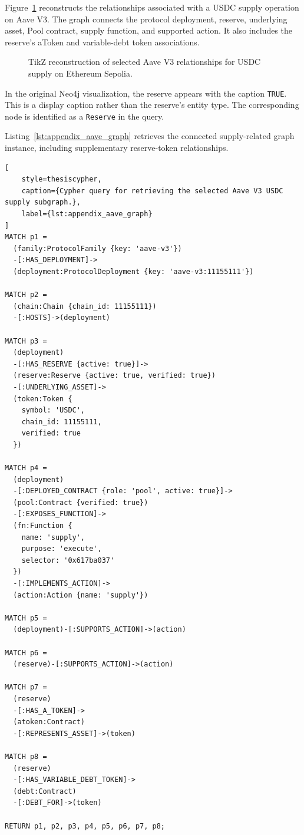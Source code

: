 Figure~\ref{fig:appendix_aave_neo4j} reconstructs the
relationships associated with a USDC supply operation
on Aave V3. The graph connects the protocol deployment,
reserve, underlying asset, Pool contract, supply function,
and supported action. It also includes the reserve's
aToken and variable-debt token associations.

\begin{figure}[H]
    \centering
    \resizebox{\linewidth}{!}{%
    }
    \caption{TikZ reconstruction of selected Aave V3
    relationships for USDC supply on Ethereum Sepolia.}
    \label{fig:appendix_aave_neo4j}
\end{figure}

In the original Neo4j visualization, the reserve appears
with the caption \texttt{TRUE}. This is a display caption
rather than the reserve's entity type. The corresponding
node is identified as a \texttt{Reserve} in the query.

Listing~\ref{lst:appendix_aave_graph} retrieves the
connected supply-related graph instance, including
supplementary reserve-token relationships.

\begin{lstlisting}[
    style=thesiscypher,
    caption={Cypher query for retrieving the selected Aave V3 USDC supply subgraph.},
    label={lst:appendix_aave_graph}
]
MATCH p1 =
  (family:ProtocolFamily {key: 'aave-v3'})
  -[:HAS_DEPLOYMENT]->
  (deployment:ProtocolDeployment {key: 'aave-v3:11155111'})

MATCH p2 =
  (chain:Chain {chain_id: 11155111})
  -[:HOSTS]->(deployment)

MATCH p3 =
  (deployment)
  -[:HAS_RESERVE {active: true}]->
  (reserve:Reserve {active: true, verified: true})
  -[:UNDERLYING_ASSET]->
  (token:Token {
    symbol: 'USDC',
    chain_id: 11155111,
    verified: true
  })

MATCH p4 =
  (deployment)
  -[:DEPLOYED_CONTRACT {role: 'pool', active: true}]->
  (pool:Contract {verified: true})
  -[:EXPOSES_FUNCTION]->
  (fn:Function {
    name: 'supply',
    purpose: 'execute',
    selector: '0x617ba037'
  })
  -[:IMPLEMENTS_ACTION]->
  (action:Action {name: 'supply'})

MATCH p5 =
  (deployment)-[:SUPPORTS_ACTION]->(action)

MATCH p6 =
  (reserve)-[:SUPPORTS_ACTION]->(action)

MATCH p7 =
  (reserve)
  -[:HAS_A_TOKEN]->
  (atoken:Contract)
  -[:REPRESENTS_ASSET]->(token)

MATCH p8 =
  (reserve)
  -[:HAS_VARIABLE_DEBT_TOKEN]->
  (debt:Contract)
  -[:DEBT_FOR]->(token)

RETURN p1, p2, p3, p4, p5, p6, p7, p8;
\end{lstlisting}

